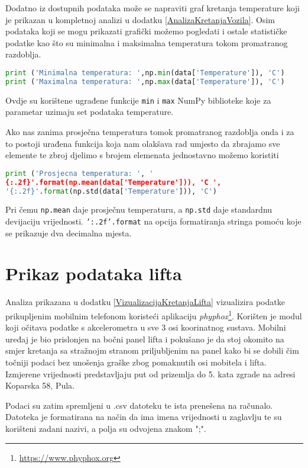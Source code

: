 Dodatno iz dostupnih podataka može se napraviti graf kretanja temperature koji je prikazan u kompletnoj analizi u dodatku \ref{AnalizaKretanjaVozila}.
Osim podataka koji se mogu prikazati grafički možemo pogledati i ostale statističke podatke kao što su minimalna i maksimalna temperatura tokom promatranog razdoblja.
\begin{lstlisting}[language=Python]
print ('Minimalna temperatura: ',np.min(data['Temperature']), 'C')
print ('Maximalna temperatura: ',np.max(data['Temperature']), 'C')
\end{lstlisting}
Ovdje su korištene ugrađene funkcije \texttt{min} i \texttt{max} NumPy biblioteke koje za parametar uzimaju set podataka temperature.

Ako nas zanima prosječna temperatura tomok promatranog razdoblja onda i za to postoji urađena funkcija koja nam olakšava rad umjesto da zbrajamo sve elemente te zbroj djelimo s brojem elemenata jednostavno možemo koristiti
\begin{lstlisting}[language=Python]
print ('Prosjecna temperatura: ', '
{:.2f}'.format(np.mean(data['Temperature'])), 'C ',
'{:.2f}'.format(np.std(data['Temperature'])), 'C')
\end{lstlisting}
Pri čemu \texttt{np.mean} daje prosječnu temperaturu, a \texttt{np.std} daje standardnu devijaciju vrijednosti.
\texttt{'{:.2f}'.format} na opcija formatiranja stringa pomoću koje se prikazuje dva decimalna mjesta.

\section{Prikaz podataka lifta}
Analiza prikazana u dodatku \ref{VizualizacijaKretanjaLifta} vizualizira podatke prikupljenim mobilnim telefonom koristeći aplikaciju \textit{phyphox}\footnote{\url{https://www.phyphox.org}}.
Korišten je modul koji očitava podatke s akcelerometra u sve 3 osi koorinatnog sustava.
Mobilni uređaj je bio prislonjen na bočni panel lifta i pokušano je da stoj okomito na smjer kretanja sa stražnojm stranom priljubljenim na panel kako bi se dobili čim točniji podaci bez unošenja graške zbog pomaknutih osi mobitela i lifta.
Izmjerene vrijednosti predstavljaju put od prizemlja do 5. kata zgrade na adresi Koparska 58, Pula.

Podaci su zatim spremljeni u .csv datoteku te ista prenešena na računalo.
Datoteka je formatirana na način da ima imena vrijednosti u zaglavlju te su korišteni zadani nazivi, a polja su odvojena znakom ";".